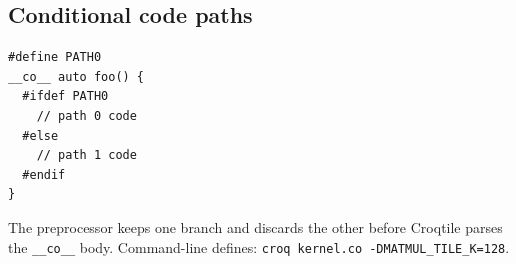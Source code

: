 \subsection*{Conditional code paths}

\begin{lstlisting}[language=croqtile,caption={Conditional code paths}]
#define PATH0
__co__ auto foo() {
  #ifdef PATH0
    // path 0 code
  #else
    // path 1 code
  #endif
}
\end{lstlisting}

The preprocessor keeps one branch and discards the other before Croqtile parses the \texttt{\_\_co\_\_} body. Command-line defines: \texttt{croq kernel.\allowbreak{}co -\allowbreak{}DMATMUL\_\allowbreak{}TILE\_\allowbreak{}K=128}.
